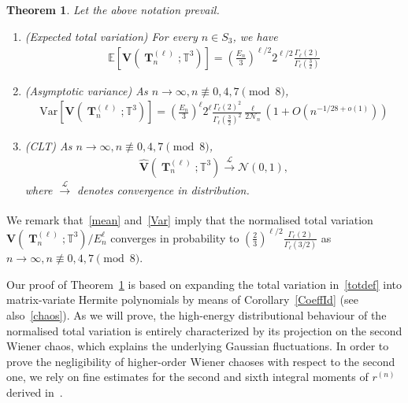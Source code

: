 \documentclass[10pt]{amsart}
\newtheorem{theo}{Theorem}[section]
\theoremstyle{definition}\newtheorem{defi}[theo]{Definition}\newtheorem{rema}[theo]{Remark}\newtheorem{exam}[theo]{Example}\newtheorem{exem}[theo]{Example}\newtheorem{nota}[theo]{Notation}
\DeclareMathOperator{\bT}{\mathbf{T}}
\newcommand{\scN}{\mathscr{N}}
\newcommand{\bfv}{\mathbf{V}}
\newcommand{\T}{\mathbb{T}^3}
\newcommand{\E}[1]{\mathbb{E}\left[#1\right]}
\newcommand{\V}[1]{\mathrm{Var}{\left[#1\right]}}
\newcommand{\Law}{\xrightarrow[]{\mathcal{L}} }
\newcommand{\notcon}[3]{ {#1} \not\equiv {#2} \pmod {#3} }
\newcommand{\Nn}{\mathcal{N}_n}
\newcommand*{\romanenumi}{\renewcommand*{\theenumi}{\roman{enumi}}}
\begin{document}
\begin{theo}\label{ARW}
Let the above notation prevail.
\begin{enumerate}\romanenumi
\item (Expected total variation) For every $n \in S_3$, we have
\begin{gather}\label{mean}
\E{\bfv\left(\bT_n^{(\ell)};\T\right)} =
\left(\frac{E_n}{3}\right)^{\ell/2} 2^{\ell/2}\frac{\Gamma_{\ell}(2)}{\Gamma_{\ell}\left(\frac{3}{2}\right)}
\end{gather}
\item (Asymptotic variance) As $n\to \infty, \notcon{n}{0,4,7}{8}$,
\begin{gather}\label{Var}
\V{\bfv\left(\bT_n^{(\ell)};\T\right)} =
\left(\frac{E_n}{3}\right)^{\ell} 2^{\ell} \frac{\Gamma_{\ell}(2)^2}{\Gamma_{\ell}\left(\frac{3}{2}\right)^2}
\frac{\ell}{2\Nn}\left(1 + O\left(n^{-1/28+o(1)}\right)\right)
\end{gather}
\item (CLT) As $n\to \infty, \notcon{n}{0,4,7}{8}$,
\begin{gather}\label{CLT}
\widehat{\bfv}\left(\bT_n^{(\ell)};\T\right) \Law \scN(0,1),
\end{gather}
where $\Law$ denotes convergence in distribution.
\end{enumerate}
\end{theo}




We remark that~\eqref{mean} and~\eqref{Var} imply that the normalised total variation $\bfv(\bT_n^{(\ell)};\T)/E_n^{\ell}$ converges in probability to $(\frac{2}{3})^{\ell/2}\frac{\Gamma_{\ell}(2)}{\Gamma_{\ell}(3/2)}$ as $n\to \infty,\notcon{n}{0,4,7}{8}$.

Our proof of Theorem~\ref{ARW} is based on expanding the total variation in~\eqref{totdef} into matrix-variate Hermite polynomials by means of Corollary~\ref{CoeffId} (see also~\eqref{chaos}). As we will prove, the high-energy distributional behaviour of the normalised total variation is entirely characterized by its projection on the second Wiener chaos, which explains the underlying Gaussian fluctuations. In order to prove the negligibility of higher-order Wiener chaoses with respect to the second one, we rely on fine estimates for the second and sixth integral moments of $r^{(n)}$ derived in~\cite{BM17}.
\end{document}
